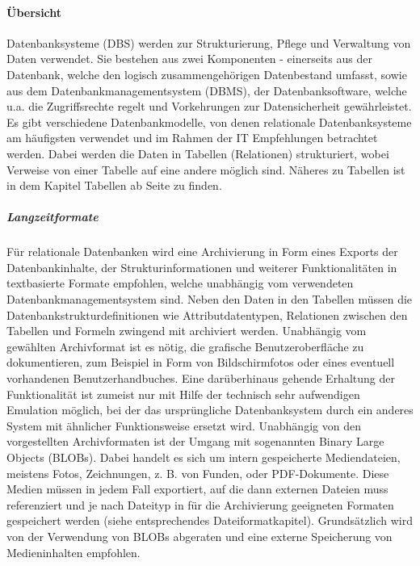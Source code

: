 \paragraph{Übersicht}
Datenbanksysteme (DBS) werden zur Strukturierung, Pflege und Verwaltung von Daten verwendet. Sie bestehen aus zwei Komponenten - einerseits aus der Datenbank, welche den logisch zusammengehörigen Datenbestand umfasst, sowie aus dem  Datenbankmanagementsystem (DBMS), der Datenbanksoftware, welche u.a. die Zugriffsrechte regelt und Vorkehrungen zur Datensicherheit gewährleistet. Es gibt verschiedene Datenbankmodelle, von denen relationale Datenbanksysteme am häufigsten verwendet und im Rahmen der IT Empfehlungen betrachtet werden. Dabei werden die Daten in Tabellen (Relationen) strukturiert, wobei Verweise von einer Tabelle auf eine andere möglich sind. Näheres zu Tabellen ist in dem Kapitel Tabellen ab Seite \pageref{tabellen} zu finden.

\subparagraph{Langzeitformate}
Für relationale Datenbanken wird eine Archivierung in Form eines Exports der Datenbankinhalte, der Strukturinformationen und weiterer Funktionalitäten in textbasierte Formate empfohlen, welche unabhängig vom verwendeten Datenbankmanagementsystem sind. Neben den Daten in den Tabellen müssen die Datenbankstrukturdefinitionen wie Attributdatentypen, Relationen zwischen den Tabellen und Formeln zwingend mit archiviert werden. Unabhängig vom gewählten Archivformat ist es nötig, die grafische Benutzeroberfläche zu dokumentieren, zum Beispiel in Form von Bildschirmfotos oder eines eventuell vorhandenen Benutzerhandbuches. Eine darüberhinaus gehende Erhaltung der Funktionalität ist zumeist nur mit Hilfe der technisch sehr aufwendigen Emulation möglich, bei der das ursprüngliche Datenbanksystem durch ein anderes System mit ähnlicher Funktionsweise ersetzt wird. Unabhängig von den vorgestellten Archivformaten ist der Umgang mit sogenannten Binary Large Objects (BLOBs). Dabei handelt es sich um intern gespeicherte Mediendateien, meistens Fotos, Zeichnungen, z. B. von Funden, oder PDF-Dokumente. Diese Medien müssen in jedem Fall exportiert, auf die dann externen Dateien muss referenziert und je nach Dateityp in für die Archivierung geeigneten Formaten gespeichert werden (siehe entsprechendes Dateiformatkapitel). Grundsätzlich wird von der Verwendung von BLOBs abgeraten und eine externe Speicherung von Medieninhalten empfohlen.

